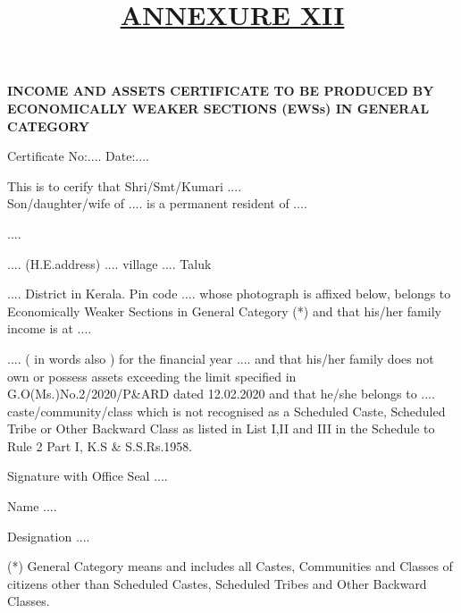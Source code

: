 \documentclass[10.5pt]{article}
\date{\vspace{-5ex}}
\title{\textbf{\underline{ANNEXURE XII}}}
\begin{document}
\maketitle
\begin{center}
\textbf{INCOME AND ASSETS CERTIFICATE TO BE PRODUCED BY ECONOMICALLY WEAKER SECTIONS (EWSs) IN GENERAL CATEGORY}
\end{center}

\vspace*{1cm}

Certificate No:\noindent \leaders\hbox{....}\hfill\kern0pt \hfill
Date:\noindent \leaders\hbox{....}\hfill\kern0pt

\vspace*{1cm}

This is to cerify that Shri/Smt/Kumari \noindent \leaders\hbox{....}\hfill\kern0pt \\
Son/daughter/wife of \leaders\hbox{....}\hfill\kern0pt is a permanent resident of  \noindent \leaders\hbox{....}\hfill\kern0pt \par
\noindent \cleaders\hbox{....}\hfill\kern0pt \par
\noindent \xleaders\hbox{....}\hfill\kern0pt 
(H.E.address) \noindent \xleaders\hbox{....}\hfill\kern0pt  village 
\noindent \xleaders\hbox{....}\hfill\kern0pt Taluk \par
\noindent \xleaders\hbox{....}\hfill\kern0pt District in Kerala. Pin code
\noindent \xleaders\hbox{....}\hfill\kern0pt whose 
photograph is affixed below, belongs to Economically Weaker Sections in 
General Category (*) and that his/her family income is at \rupee \noindent \xleaders\hbox{....}\hfill\kern0pt \par 
\noindent \xleaders\hbox{....}\hfill\kern0pt ( in words also ) for the financial year
\noindent \xleaders\hbox{....}\hfill\kern0pt and that his/her family does not own or possess assets exceeding the limit specified in G.O(Ms.)No.2/2020/P\&ARD dated 12.02.2020 and that he/she belongs to
\noindent \xleaders\hbox{....}\hfill\kern0pt caste/community/class which is not recognised as a Scheduled Caste, Scheduled Tribe or Other Backward Class as listed in List I,II and III in the Schedule to Rule 2 Part I, K.S \& S.S.Rs.1958.


\vspace{1cm}
\begin{minipage}{.5\textwidth}
\end{minipage}
\hfill
\begin{minipage}{.5\textwidth}
 Signature with Office Seal \noindent \xleaders\hbox{....}\hfill\kern0pt \par
 \vspace{.74cm}
 Name \noindent \xleaders\hbox{....}\hfill\kern0pt \par
  \vspace{.75cm}
Designation \noindent \xleaders\hbox{....}\hfill\kern0pt

\end{minipage}

\vspace{1cm}
\centering
\small{(*) General Category means and includes all Castes, Communities and Classes of citizens other than Scheduled Castes, Scheduled Tribes and Other Backward Classes.}
\end{document}
